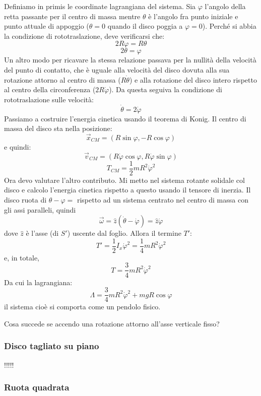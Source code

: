 \documentclass[a4paper,openany]{article}
\begin{document}
	Definiamo in primis le coordinate lagrangiana del sistema. Sia $\varphi$ l'angolo della retta passante per il centro di massa mentre $\theta$ è l'angolo fra punto iniziale e punto attuale di appoggio ($\theta = 0$ quando il disco poggia a $\varphi = 0$). Perché si abbia la condizione di rototraslazione, deve verificarsi che:
	$$
	2R\varphi = R\theta
	$$
	$$
	2\theta = \varphi
	$$
	Un altro modo per ricavare la stessa relazione passava per la nullità della velocità del punto di contatto, che è uguale alla velocità del disco dovuta alla sua rotazione attorno al centro di massa ($R\dot{\theta}$) e alla rotazione del disco intero rispetto al centro della circonferenza ($2R\dot{\varphi}$). Da questa seguiva la condizione di rototraslazione sulle velocità:
	$$
	\dot{\theta} = 2\dot{\varphi}
	$$
	Passiamo a costruire l'energia cinetica usando il teorema di Konig. Il centro di massa del disco sta nella posizione:
	$$
	\vec{x}_{CM}= (R\sin\varphi, -R\cos\varphi)
	$$
	e quindi:
	$$
	\vec{v}_{CM} = (R\dot{\varphi}\cos\varphi, R\dot{\varphi}\sin\varphi)
	$$
	$$
	T_{CM} = \dfrac{1}{2}mR^{2}\dot{\varphi}^{2}
	$$
	Ora devo valutare l'altro contributo. Mi metto nel sistema rotante solidale col disco e calcolo l'energia cinetica rispetto a questo usando il tensore di inerzia. Il disco ruota di $\theta-\varphi = $ rispetto ad un sistema centrato nel centro di massa con gli assi paralleli, quindi 
	$$
	\vec{\omega} = \hat{z}(\dot{\theta}-\dot{\varphi}) = \hat{z}\dot{\varphi}
	$$
	dove $\hat{z}$ è l'asse (di $S'$) uscente dal foglio. Allora il termine $T'$:
	$$
	T' = \dfrac{1}{2}I_x\dot{\varphi}^2 = \dfrac{1}{4}mR^2\dot{\varphi}^2
	$$
	e, in totale,
	$$
	T = \dfrac{3}{4}mR^2\dot{\varphi}^2
	$$
	Da cui la lagrangiana:
	$$
	\Lambda = \dfrac{3}{4}mR^2\dot{\varphi}^2+mgR\cos\varphi
	$$
	il sistema cioè si comporta come un pendolo fisico. 
	
	Cosa succede se accendo una rotazione attorno all'asse verticale fisso? 
	\subsubsection{Disco tagliato su piano}
	!!!!!
	\subsubsection{Ruota quadrata}
	
	\newpage
	
	
\end{document}
